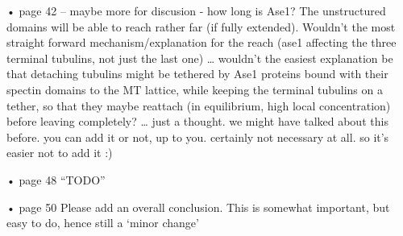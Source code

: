 
• page 42 – maybe more for discusion - how long is Ase1? The unstructured domains will be able to reach rather far (if fully extended). Wouldn’t the most straight forward mechanism/explanation for the reach (ase1 affecting the three terminal tubulins, not just the last one) … wouldn’t the easiest explanation be that detaching tubulins might be tethered by Ase1 proteins bound with their spectin domains to the MT lattice, while keeping the terminal tubulins on a tether, so that they maybe reattach (in equilibrium, high local concentration) before leaving completely?
	… just a thought. we might have talked about this before. you can add it or not, up to you. certainly not necessary at all. so it’s easier not to add it :)



• page 48  “TODO”


• page 50  Please add an overall conclusion. This is somewhat important, but easy to do, hence still a ‘minor change’








